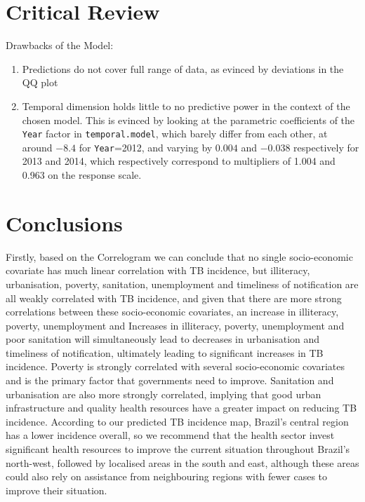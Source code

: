 \section{Critical Review}
Drawbacks of the Model:
\begin{enumerate}
\item Predictions do not cover full range of data, as evinced by deviations in the QQ plot
\item Temporal dimension holds little to no predictive power in the context of the chosen model. This is evinced by looking at the parametric coefficients of the \texttt{Year} factor in \texttt{temporal.model}, which barely differ from each other, at around $-8.4$ for \texttt{Year}=2012, and varying by $0.004$ and $-0.038$ respectively for 2013 and 2014, which respectively correspond to multipliers of 1.004 and 0.963 on the response scale.
\end{enumerate}

\section{Conclusions}
Firstly, based on the Correlogram we can conclude that no single socio-economic covariate has much linear correlation with TB incidence, but illiteracy, urbanisation, poverty, sanitation, unemployment and timeliness of notification are all weakly correlated with TB incidence, and given that there are more strong correlations between these socio-economic covariates, an increase in illiteracy, poverty, unemployment and Increases in illiteracy, poverty, unemployment and poor sanitation will simultaneously lead to decreases in urbanisation and timeliness of notification, ultimately leading to significant increases in TB incidence. Poverty is strongly correlated with several socio-economic covariates and is the primary factor that governments need to improve. Sanitation and urbanisation are also more strongly correlated, implying that good urban infrastructure and quality health resources have a greater impact on reducing TB incidence. According to our predicted TB incidence map, Brazil's central region has a lower incidence overall, so we recommend that the health sector invest significant health resources to improve the current situation throughout Brazil's north-west, followed by localised areas in the south and east, although these areas could also rely on assistance from neighbouring regions with fewer cases to improve their situation.